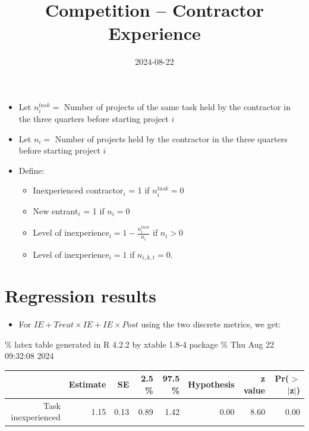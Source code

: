 \documentclass[
]{article}
\title{Competition -- Contractor Experience}
\author{}
\date{\vspace{-2.5em}2024-08-22}
\providecommand{\tightlist}{%
  \setlength{\itemsep}{0pt}\setlength{\parskip}{0pt}}
\begin{document}
\maketitle

\begin{itemize}
\item
  Let \(n^{task}_{i}=\) Number of projects of the same task held by the
  contractor in the three quarters before starting project \(i\)
\item
  Let \(n_{i}=\) Number of projects held by the contractor in the three
  quarters before starting project \(i\)
\item
  Define:

  \begin{itemize}
  \tightlist
  \item
    Inexperienced contractor\(_i\) = 1 if \(n^{task}_{i}=0\)
  \item
    New entrant\(_i\) = 1 if \(n_{i}=0\)
  \item
    Level of inexperience\(_{i}= 1 - \frac{n^{task}_{i}}{n_{i}}\) if
    \(n_{i}>0\)
  \item
    Level of inexperience\(_{i}= 1\) if \(n_{i,k,t}=0\).
  \end{itemize}
\end{itemize}

\hypertarget{regression-results}{%
\section{Regression results}\label{regression-results}}

\begin{itemize}
\tightlist
\item
  For \(IE + Treat \times IE + IE \times Post\) using the two discrete
  metrics, we get:
\end{itemize}

\% latex table generated in R 4.2.2 by xtable 1.8-4 package \% Thu Aug
22 09:32:08 2024

\begin{table}[ht]
\centering
\begin{tabular}{rrrrrrrr}
  \hline
 & Estimate & SE & 2.5 \% & 97.5 \% & Hypothesis & z value & Pr($>$$|$z$|$) \\ 
  \hline
Task inexperienced & 1.15 & 0.13 & 0.89 & 1.42 & 0.00 & 8.60 & 0.00 \\ 
   \hline
\end{tabular}
\end{table}
\end{document}
